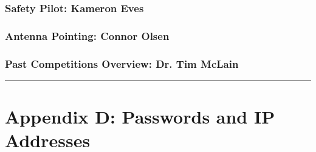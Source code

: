 \documentclass[]{auvsi_doc}
\begin{document}
\hypertarget{h.5qjlfzs1vco2}{\subsubsection{\texorpdfstring{{Safety
Pilot: Kameron
Eves}}{Safety Pilot: Kameron Eves}}\label{h.5qjlfzs1vco2}}

\hypertarget{h.onmum1m8p9el}{\subsubsection{\texorpdfstring{{Antenna
Pointing: Connor
Olsen}}{Antenna Pointing: Connor Olsen}}\label{h.onmum1m8p9el}}

\hypertarget{h.9vddyurbqkh1}{\subsubsection{\texorpdfstring{{Past
Competitions Overview: Dr. Tim
McLain}}{Past Competitions Overview: Dr. Tim McLain}}\label{h.9vddyurbqkh1}}

\begin{center}\rule{0.5\linewidth}{\linethickness}\end{center}

\section{\texorpdfstring{{}}{}}\label{h.r61o3pbzck6b}

\hypertarget{h.ejo1f4jddl42}{\section{\texorpdfstring{{Appendix D:
Passwords and IP
Addresses}}{Appendix D: Passwords and IP Addresses}}\label{h.ejo1f4jddl42}}
\end{document}
